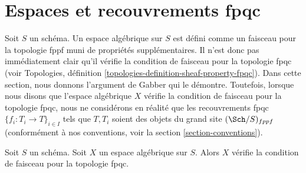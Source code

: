 \section{Espaces et recouvrements fpqc}
\label{section-fpqc}

\noindent
Soit $S$ un schéma.
Un espace algébrique sur $S$ est défini comme un faisceau pour la topologie fppf muni de
propriétés supplémentaires. Il n'est donc pas immédiatement clair qu'il vérifie
la condition de faisceau pour la topologie fpqc (voir
Topologies, définition \ref{topologies-definition-sheaf-property-fpqc}).
Dans cette section, nous donnons l'argument de Gabber qui le démontre.
Toutefois, lorsque nous disons que l'espace algébrique $X$ vérifie la
condition de faisceau pour la topologie fpqc, nous ne considérons en réalité que les
recouvrements fpqc $\{f_i : T_i \to T\}_{i \in I}$ tels que $T, T_i$ soient des
objets du grand site $(\Sch/S)_{fppf}$ (conformément à
nos conventions, voir la section \ref{section-conventions}).

\begin{proposition}[Gabber]
\label{proposition-sheaf-fpqc}
Soit $S$ un schéma. Soit $X$ un espace algébrique sur $S$. Alors
$X$ vérifie la condition de faisceau pour la topologie fpqc.
\end{proposition}

